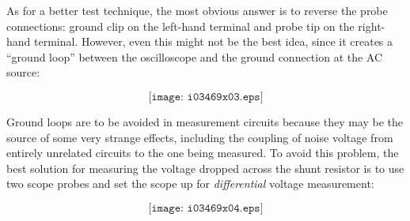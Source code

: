 \vskip 10pt

As for a better test technique, the most obvious answer is to reverse the probe connections: ground clip on the left-hand terminal and probe tip on the right-hand terminal.  However, even this might not be the best idea, since it creates a ``ground loop'' between the oscilloscope and the ground connection at the AC source:

$$\texttt{[image: i03469x03.eps]}$$

\filbreak

Ground loops are to be avoided in measurement circuits because they may be the source of some very strange effects, including the coupling of noise voltage from entirely unrelated circuits to the one being measured.  To avoid this problem, the best solution for measuring the voltage dropped across the shunt resistor is to use two scope probes and set the scope up for {\it differential} voltage measurement:

$$\texttt{[image: i03469x04.eps]}$$











